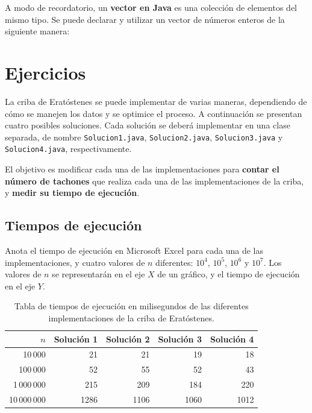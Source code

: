 \documentclass[
  spanish,
  11pt,
  a4paper,
  DIV=11,
  numbers=noendperiod]{scrartcl}
\begin{document}
A modo de recordatorio, un \textbf{vector en Java} es una colección de elementos del mismo tipo. Se puede declarar y utilizar un vector de números enteros de la siguiente manera:


\section{Ejercicios}\label{ejercicios}

La criba de Eratóstenes se puede implementar de varias maneras, dependiendo de cómo se manejen los datos y se optimice el proceso. A continuación se presentan cuatro posibles soluciones. Cada solución se deberá implementar en una clase separada, de nombre \texttt{Solucion1.java}, \texttt{Solucion2.java}, \texttt{Solucion3.java} y \texttt{Solucion4.java}, respectivamente.

El objetivo es modificar cada una de las implementaciones para \textbf{contar el número de tachones} que realiza cada una de las implementaciones de la criba, y \textbf{medir su tiempo de ejecución}.

\subsection{Tiempos de ejecución}\label{tiempos-de-ejecucion}

Anota el tiempo de ejecución en Microsoft Excel para cada una de las implementaciones, y cuatro valores de \(n\) diferentes: \(10^4\), \(10^5\), \(10^6\) y \(10^7\). Los valores de \(n\) se representarán en el eje \(X\) de un gráfico, y el tiempo de ejecución en el eje \(Y\).

\begin{table}[H]
\centering
\begin{tabular}{r|rrrr}
\textbf{\(n\)} & \textbf{Solución 1} & \textbf{Solución 2} & \textbf{Solución 3} & \textbf{Solución 4} \\
\hline
10\,000 & 21 & 21 & 19 & 18 \\
100\,000 & 52 & 55 & 52 & 43 \\
1\,000\,000 & 215 & 209 & 184 & 220 \\
10\,000\,000 & 1286 & 1106 & 1060 & 1012 \\
\end{tabular}
\caption{Tabla de tiempos de ejecución en milisegundos de las diferentes implementaciones de la criba de Eratóstenes.}\label{tbl-p5-tiempos}
\end{table}
\end{document}
